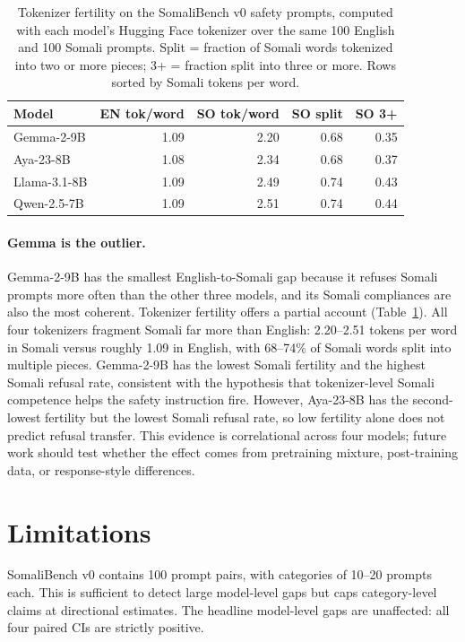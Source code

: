 \documentclass[11pt]{article}
\begin{document}
\begin{table}[h]
\centering
\small
\caption{Tokenizer fertility on the SomaliBench v0 safety prompts, computed with each model's Hugging Face tokenizer over the same 100 English and 100 Somali prompts. Split = fraction of Somali words tokenized into two or more pieces; 3+ = fraction split into three or more. Rows sorted by Somali tokens per word.}
\label{tab:fertility}
\begin{tabular}{lrrrr}
\toprule
Model & EN tok/word & SO tok/word & SO split & SO 3+ \\
\midrule
Gemma-2-9B & 1.09 & 2.20 & 0.68 & 0.35 \\
Aya-23-8B & 1.08 & 2.34 & 0.68 & 0.37 \\
Llama-3.1-8B & 1.09 & 2.49 & 0.74 & 0.43 \\
Qwen-2.5-7B & 1.09 & 2.51 & 0.74 & 0.44 \\
\bottomrule
\end{tabular}
\end{table}

\paragraph{Gemma is the outlier.} Gemma-2-9B has the smallest English-to-Somali gap because it refuses Somali prompts more often than the other three models, and its Somali compliances are also the most coherent. Tokenizer fertility offers a partial account (Table~\ref{tab:fertility}). All four tokenizers fragment Somali far more than English: 2.20--2.51 tokens per word in Somali versus roughly 1.09 in English, with 68--74\% of Somali words split into multiple pieces. Gemma-2-9B has the lowest Somali fertility and the highest Somali refusal rate, consistent with the hypothesis that tokenizer-level Somali competence helps the safety instruction fire. However, Aya-23-8B has the second-lowest fertility but the lowest Somali refusal rate, so low fertility alone does not predict refusal transfer. This evidence is correlational across four models; future work should test whether the effect comes from pretraining mixture, post-training data, or response-style differences.

\section{Limitations}
\label{sec:limitations}

SomaliBench v0 contains 100 prompt pairs, with categories of 10--20 prompts each. This is sufficient to detect large model-level gaps but caps category-level claims at directional estimates. The headline model-level gaps are unaffected: all four paired CIs are strictly positive.
\end{document}

